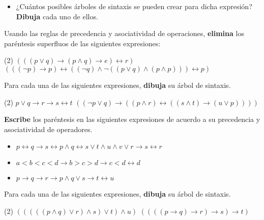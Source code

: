 \documentclass[oneside]{style}
\begin{document}
\begin{questions}[label=\protect\circled{\bfseries\arabic*}]
{\begin{itemize}
            \item ¿Cuántos posibles árboles de sintaxis se pueden crear para 
            dicha expresión? \textbf{Dibuja} cada uno de ellos. 
        \end{itemize}
    }

    \question
    {
        Usando las reglas de precedencia y asociatividad de operaciones, 
        \textbf{elimina} los paréntesis superfluos de las siguientes 
        expresiones:
        \begin{tasks}(2)
            \task $(((p \lor q) \rightarrow (p \land q) \rightarrow e) 
            \leftrightarrow r)$
            \task $(((\neg p) \rightarrow p) \leftrightarrow ((\neg q) \land 
            \neg((p \lor q) \land (p \land p))) \leftrightarrow p)$
        \end{tasks}
    }

    \newpage
    \question
    {
        Para cada una de las siguientes expresiones, \textbf{dibuja} su árbol 
        de sintaxis. 
        \begin{tasks}(2)
            \task $p \lor q \rightarrow r \rightarrow s \leftrightarrow t$
            \task $((\neg p \lor q) \rightarrow ((p \land r) \leftrightarrow 
            ((s \land t) \rightarrow (u \lor p))))$
        \end{tasks}
    }

    \question
    {
        \textbf{Escribe} los paréntesis en las siguientes expresiones de 
        acuerdo a su precedencia y asociatividad de operadores.
        \begin{itemize}
            \item $p \leftrightarrow q \rightarrow s \leftrightarrow p \land q
            \leftrightarrow s \lor t \land u \land v \lor r \rightarrow s 
            \leftrightarrow r$

            \item $a < b < c < d \rightarrow b > c > d \rightarrow c < d 
            \leftrightarrow d$

            \item $p \rightarrow q \rightarrow r \rightarrow p \land q \lor s
            \rightarrow t \leftrightarrow u$
        \end{itemize}
    }

    \question
    {
        Para cada una de las siguientes expresiones, \textbf{dibuja} su árbol 
        de sintaxis. 
        \begin{tasks}(2)
            \task $(((((p \land q) \lor r) \land s) \lor t) \land u)$
            \task $((((p \rightarrow q) \rightarrow r) \rightarrow s) 
            \rightarrow t)$
        \end{tasks}
    }


\end{questions}
\end{document}
